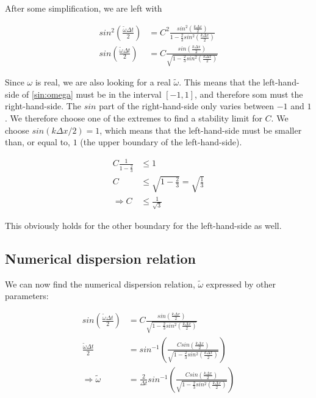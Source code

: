 \documentclass[twoside]{article}
\newcommand{\dt}{\Delta t}
\newcommand{\dx}{\Delta x}
\newcommand{\wt}{\tilde{\omega}}
\begin{document}
After some simplification, we are left with

\begin{align}
sin^2\left(\frac{\tilde{\omega}\dt}{2}\right) &= C^2 \frac{sin^2\left(\frac{k\dx}{2}\right)}{1 - \frac{2}{3}sin^2\left(\frac{k\dx}{2}\right)}\nonumber\\
sin\left(\frac{\tilde{\omega}\dt}{2}\right) &= C \frac{sin\left(\frac{k\dx}{2}\right)}{\sqrt{1 - \frac{2}{3}sin^2\left(\frac{k\dx}{2}\right)}} \label{sin:omega}
\end{align}

Since $\omega$ is real, we are also looking for a real $\tilde{\omega}$. This means that the left-hand-side of \eqref{sin:omega} must be in the interval $[-1,1]$, and therefore som must the right-hand-side. The $sin$ part of the right-hand-side only varies between $-1$ and $1$. We therefore choose one of the extremes to find a stability limit for $C$. We choose $sin(k\dx/2) = 1$, which means that the left-hand-side must be smaller than, or equal to, $1$ (the upper boundary of the left-hand-side).

\begin{align*}
C\frac{1}{1 - \frac{2}{3}} &\leq 1\\
C & \leq \sqrt{1 - \frac{2}{3}} = \sqrt{\frac{1}{3}}\\
\Rightarrow C &\leq {\frac{1}{\sqrt{3}}}
\end{align*}

This obviously holds for the other boundary for the left-hand-side as well.


\subsection{Numerical dispersion relation}

We can now find the numerical dispersion relation, $\wt$ expressed by other parameters:

\begin{align*}
sin\left(\frac{\tilde{\omega}\dt}{2}\right) &= C \frac{sin\left(\frac{k\dx}{2}\right)}{\sqrt{1 - \frac{2}{3}sin^2\left(\frac{k\dx}{2}\right)}}\\
\frac{\tilde{\omega}\dt}{2} &= sin^{-1}\left(\frac{C sin\left(\frac{k\dx}{2}\right)}{\sqrt{1 - \frac{2}{3}sin^2\left(\frac{k\dx}{2}\right)}}\right)\\
\Rightarrow \wt &= \frac{2}{\dt} sin^{-1}\left(\frac{C sin\left(\frac{k\dx}{2}\right)}{\sqrt{1 - \frac{2}{3}sin^2\left(\frac{k\dx}{2}\right)}}\right)
\end{align*}
\end{document}
